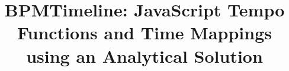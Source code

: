 \documentclass{sig-alternate}
\begin{document}


%
%
%

%

\title{BPMTimeline: JavaScript Tempo Functions and Time Mappings using an Analytical Solution}
%
%
%
%
%
\end{document}

